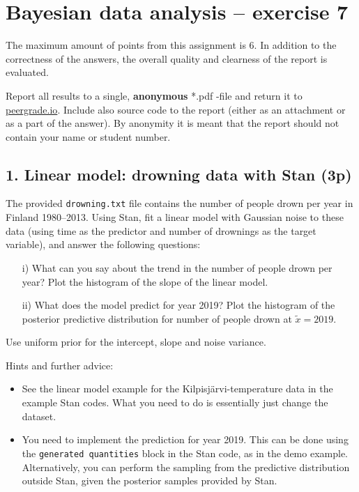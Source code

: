 \documentclass[a4paper,11pt]{article}
\newcommand{\HRule}{\rule{\linewidth}{0.5mm}}
\begin{document}
\thispagestyle{empty}

\section*{Bayesian data analysis -- exercise 7}


The maximum amount of points from this assignment is 6. In addition to the correctness of the answers, the overall quality and clearness of the report is evaluated.

Report all results to a single, {\bf anonymous} *.pdf -file and return it to \href{peergrade.io}{peergrade.io}. Include also source code to the report (either as an attachment or as a part of the answer). By anonymity it is meant that the report should not contain your name or student number.


\vspace{1cm}


\subsection*{1. Linear model: drowning data with Stan (3p)}

The provided {\tt drowning.txt} file contains the number of people drown per year in Finland 1980--2013.
Using Stan, fit a linear model with Gaussian noise to these data (using time as the predictor and number of drownings as the target variable), and answer the following questions:
\begin{itemize}
	\item [i)] What can you say about the trend in the number of people drown per year? Plot the histogram of the slope of the linear model.
	\item [ii)] What does the model predict for year 2019? Plot the histogram of the posterior predictive distribution for number of people drown at $\tilde x=2019$.
\end{itemize}
Use uniform prior for the intercept, slope and noise variance.

Hints and further advice:
\begin{itemize}
\item See the linear model example for the Kilpisjärvi-temperature data in the example Stan codes. What you need to do is essentially just change the dataset.
\item You need to implement the prediction for year 2019. This can be done using the {\tt generated quantities} block in the Stan code, as in the demo example. Alternatively, you can perform the sampling from the predictive distribution outside Stan, given the posterior samples provided by Stan.
\end{itemize}
\end{document}
